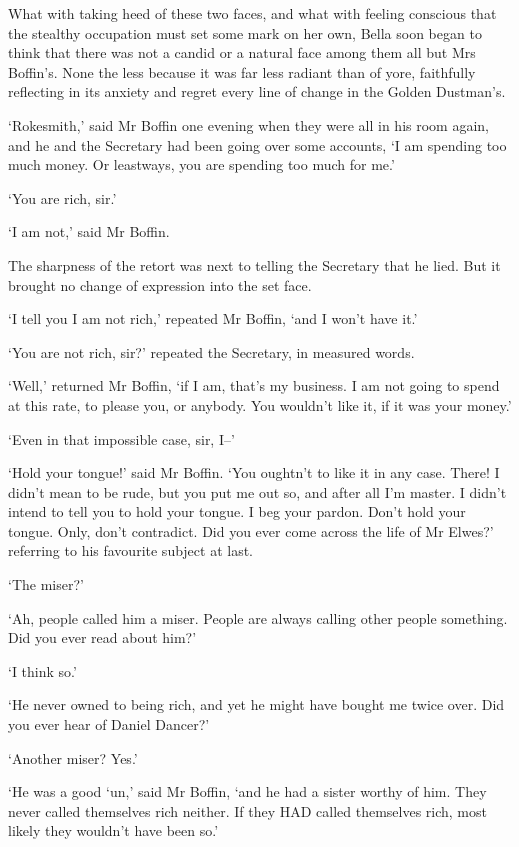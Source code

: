 What with taking heed of these two faces, and what with feeling
conscious that the stealthy occupation must set some mark on her own,
Bella soon began to think that there was not a candid or a natural face
among them all but Mrs Boffin’s. None the less because it was far less
radiant than of yore, faithfully reflecting in its anxiety and regret
every line of change in the Golden Dustman’s.

‘Rokesmith,’ said Mr Boffin one evening when they were all in his room
again, and he and the Secretary had been going over some accounts, ‘I
am spending too much money. Or leastways, you are spending too much for
me.’

‘You are rich, sir.’

‘I am not,’ said Mr Boffin.

The sharpness of the retort was next to telling the Secretary that he
lied. But it brought no change of expression into the set face.

‘I tell you I am not rich,’ repeated Mr Boffin, ‘and I won’t have it.’

‘You are not rich, sir?’ repeated the Secretary, in measured words.

‘Well,’ returned Mr Boffin, ‘if I am, that’s my business. I am not going
to spend at this rate, to please you, or anybody. You wouldn’t like it,
if it was your money.’

‘Even in that impossible case, sir, I--’

‘Hold your tongue!’ said Mr Boffin. ‘You oughtn’t to like it in any
case. There! I didn’t mean to be rude, but you put me out so, and after
all I’m master. I didn’t intend to tell you to hold your tongue. I beg
your pardon. Don’t hold your tongue. Only, don’t contradict. Did you
ever come across the life of Mr Elwes?’ referring to his favourite
subject at last.

‘The miser?’

‘Ah, people called him a miser. People are always calling other people
something. Did you ever read about him?’

‘I think so.’

‘He never owned to being rich, and yet he might have bought me twice
over. Did you ever hear of Daniel Dancer?’

‘Another miser? Yes.’

‘He was a good ‘un,’ said Mr Boffin, ‘and he had a sister worthy of him.
They never called themselves rich neither. If they HAD called themselves
rich, most likely they wouldn’t have been so.’

